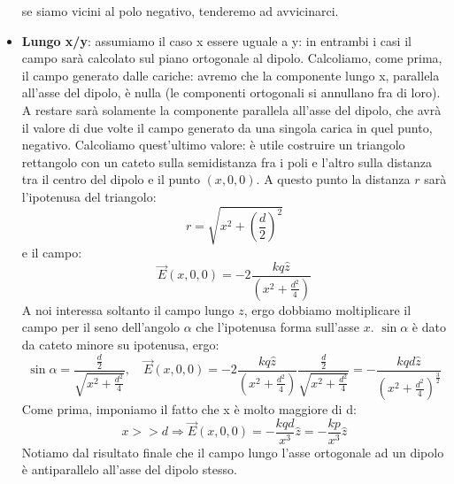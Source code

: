 \documentclass[a4paper,12pt]{article}
\begin{document}
\begin{itemize}
    se siamo vicini al polo negativo, tenderemo ad avvicinarci.
  \item \textbf{Lungo x/y}: assumiamo il caso x essere uguale a y: in entrambi i casi il campo sarà calcolato sul piano ortogonale al dipolo. Calcoliamo, come prima, il campo generato dalle cariche: avremo che la componente lungo x,
    parallela all'asse del dipolo, è nulla (le componenti ortogonali si annullano fra di loro). A restare sarà solamente la componente parallela all'asse del dipolo, che avrà il valore di due volte il campo generato da una singola carica in quel punto, negativo.
    Calcoliamo quest'ultimo valore: è utile costruire un triangolo rettangolo con un cateto sulla semidistanza fra i poli e l'altro sulla distanza tra il centro del dipolo e il punto $(x, 0, 0)$. A questo punto la distanza $r$ sarà l'ipotenusa del triangolo:
    $$ r = \sqrt{x^2 + \left(\frac{d}{2}\right)^2} $$
    e il campo:
    $$ \vec{E}(x, 0, 0) = -2\frac{kq\hat{z}}{\left(x^2 + \frac{d^2}{4}\right)} $$
    A noi interessa soltanto il campo lungo $z$, ergo dobbiamo moltiplicare il campo per il seno dell'angolo $\alpha$ che l'ipotenusa forma sull'asse $x$. $\sin{\alpha}$ è dato da cateto minore su ipotenusa, ergo:
    $$ \sin{\alpha} = \frac{\frac{d}{2}}{\sqrt{x^2+ \frac{d^2}{4}}}, \quad \vec{E}(x, 0, 0) = -2\frac{kq\hat{z}}{\left(x^2 + \frac{d^2}{4}\right)} \frac{\frac{d}{2}}{\sqrt{x^2+ \frac{d^2}{4}}} = -\frac{kqd\hat{z}}{\left( x^2 + \frac{d^2}{4} \right)^{\frac{3}{2}}} $$
    Come prima, imponiamo il fatto che x è molto maggiore di d:
    $$ x >> d \Rightarrow \vec{E}(x, 0, 0) = -\frac{kqd}{x^3}\hat{z} = -\frac{kp}{x^3}\hat{z} $$
    Notiamo dal risultato finale che il campo lungo l'asse ortogonale ad un dipolo è antiparallelo all'asse del dipolo stesso.
\end{itemize} 
\end{document}
